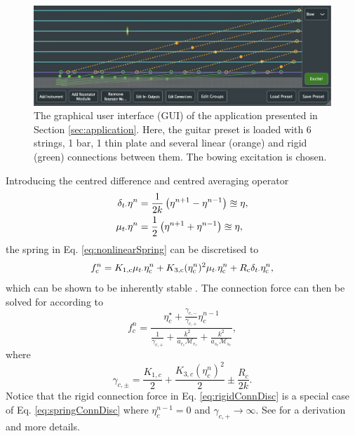 \documentclass{article}
\begin{document}
\begin{figure}[t] %
    \centering
    \includegraphics[width = \textwidth]{GUI.png}
    \caption{The graphical user interface (GUI) of the application presented in Section \ref{sec:application}. Here, the guitar preset is loaded with 6 strings, 1 bar, 1 thin plate and several linear (orange) and rigid (green) connections between them. The bowing excitation is chosen.}
    \label{fig:gui}
\end{figure}
Introducing the centred difference and centred averaging operator
\begin{align}
    \delta_{t\cdot} \eta^n &= \frac{1}{2k}\left(\eta^{n+1}-\eta^{n-1}\right)\approxeq \eta,\\
    \mu_{t\cdot} \eta^n &= \frac{1}{2}\left(\eta^{n+1}+\eta^{n-1}\right)\approxeq \eta,
\end{align}
the spring in Eq. \eqref{eq:nonlinearSpring} can be discretised to
\begin{equation}\label{eq:nonlinearSpringDisc}
    f_{\text{c}}^n = K_{1,\text{c}}\mu_{t\cdot}\eta_{\text{c}}^n + K_{3,\text{c}}(\eta_{\text{c}}^n)^2\mu_{t\cdot}\eta_{\text{c}}^n + R_{\text{c}}\delta_{t\cdot} \eta_{\text{c}}^n,
\end{equation}
which can be shown to be inherently stable \cite{theBible, Bilbao2009Modular}. The connection force can then be solved for according to \cite{theBible}
\begin{equation}\label{eq:springConnDisc}
    f_c^n = \frac{\eta_c^\star + \frac{\gamma_{c,-}}{\gamma_{c,+}}\eta_c^{n-1}}{\frac{1}{\gamma_{c,+}} + \frac{k^2}{a_{r_c}\mathcal{M}_{r_c}}+ \frac{k^2}{a_{s_c}\mathcal{M}_{s_c}}},
\end{equation}
where 
\begin{equation}
    \gamma_{c,\pm} = \frac{K_{1, c}}{2} + \frac{K_{3,c}(\eta_c^n)^2}{2} \pm \frac{R_c}{2k}.
\end{equation}
Notice that the rigid connection force in Eq. \eqref{eq:rigidConnDisc} is a special case of Eq. \eqref{eq:springConnDisc} where $\eta^{n-1}_c = 0$ and $\gamma_{c, +} \rightarrow \infty$. See \cite[Ch. 11]{WillemsenThesis} for a derivation and more details.
\end{document}
